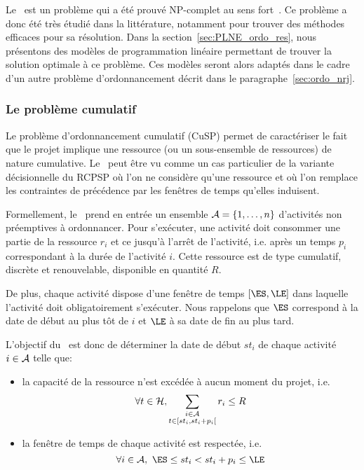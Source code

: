 Le \RCPSP~est un problème qui a été prouvé NP-complet au sens
fort~\cite{NP_RCPSP}. Ce problème a donc été très étudié dans la
littérature, notamment pour trouver des méthodes efficaces pour sa
résolution. Dans la section~\ref{sec:PLNE_ordo_res}, nous présentons des
modèles de programmation linéaire permettant de trouver la solution
optimale à ce problème. Ces modèles seront alors adaptés dans le cadre
d'un autre problème d'ordonnancement décrit dans le
paragraphe~\ref{sec:ordo_nrj}. 

\subsubsection{Le problème cumulatif}

Le problème d'ordonnancement cumulatif (CuSP) permet de caractériser
le fait que le projet implique une ressource (ou un sous-ensemble de
ressources) de nature cumulative. Le \CUSP~peut être vu comme un cas
particulier de la variante décisionnelle du RCPSP où l'on ne considère
qu'une ressource et où l'on remplace les contraintes de précédence par
les fenêtres de temps qu'elles induisent.

Formellement, le \CUSP~prend en entrée un ensemble $ {\cal A}=\{1,\dots,n\}$
d'activités non préemptives à ordonnancer. Pour s'exécuter, une
activité doit consommer une partie de la ressource $r_i$ et ce jusqu'à
l'arrêt de l'activité, i.e. après un temps $p_i$ correspondant à la
durée de l'activité $i$. Cette ressource est de type cumulatif,
discrète et renouvelable, disponible en quantité $R$.

De plus, chaque activité dispose d'une fenêtre de temps $[\ES,\LE]$
dans laquelle l'activité doit obligatoirement s'exécuter. Nous
rappelons que $\ES$ correspond à la date de début au plus tôt de $i$
et $\LE$ à sa date de fin au plus tard.

L'objectif du \CUSP~est donc de déterminer la date de début $st_i$ de
chaque activité $i \in {\cal A}$ telle que:
\begin{itemize}
\item la capacité de la ressource n'est excédée à aucun moment du
  projet, i.e.
  \begin{equation} \forall t \in {\cal H},\sum_{\substack{i\in {\cal A}\\ t \in
        [st_i,st_i+p_i[}} r_{i} \le  R
\label{eq:CUSP_res}
\end{equation}
\item la fenêtre de temps de chaque activité est respectée, i.e. 
  \begin{equation} \forall i \in \A,\ \ES \le st_i < st_i+p_i \le \LE \end{equation}
\end{itemize}

